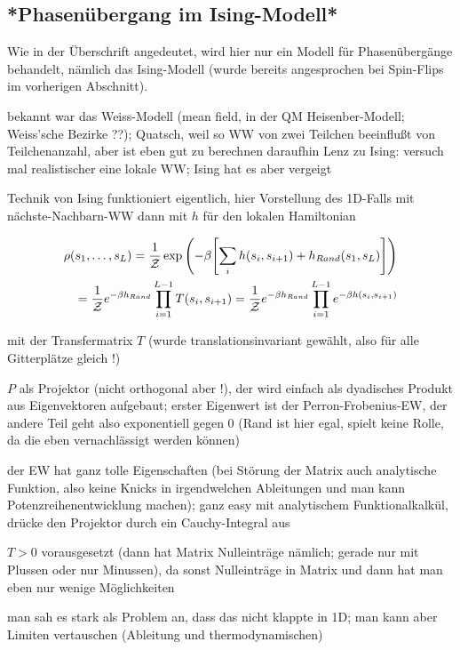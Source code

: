 \documentclass[../KlassMech_main.tex]{subfiles}
\begin{document}
	\subsection{*Phasenübergang im Ising-Modell*}
Wie in der Überschrift angedeutet, wird hier nur ein Modell für Phasenübergänge behandelt, nämlich das Ising-Modell (wurde bereits angesprochen bei Spin-Flips im vorherigen Abschnitt).

bekannt war das Weiss-Modell (mean field, in der QM Heisenber-Modell; Weiss'sche Bezirke ??); Quatsch, weil so WW von zwei Teilchen beeinflußt von Teilchenanzahl, aber ist eben gut zu berechnen
daraufhin Lenz zu Ising: versuch mal realistischer eine lokale WW; Ising hat es aber vergeigt

Technik von Ising funktioniert eigentlich, hier Vorstellung des 1D-Falls mit nächste-Nachbarn-WW
dann mit $h$ für den lokalen Hamiltonian

\begin{align}\label{key}
\rho(s_1, \dots, s_L) = \frac{1}{\mathcal{Z}} \exp\qty(-\beta \qty[\sum\limits_i h(s_i, s_{i+1}) + h_{Rand}(s_1, s_L)])
\\
= \frac{1}{\mathcal{Z}} e^{-\beta h_{Rand}} \prod_{i=1}^{L-1} T(s_i, s_{i+1}) = \frac{1}{\mathcal{Z}} e^{-\beta h_{Rand}} \prod_{i=1}^{L-1} e^{-\beta h(s_i, s_{i+1})}
\end{align}

mit der Transfermatrix $T$ (wurde translationsinvariant gewählt, also für alle Gitterplätze gleich !)

$P$ als Projektor (nicht orthogonal aber !), der wird einfach als dyadisches Produkt aus Eigenvektoren aufgebaut; erster Eigenwert ist der Perron-Frobenius-EW, der andere Teil geht also exponentiell gegen 0 (Rand ist hier egal, spielt keine Rolle, da die eben vernachlässigt werden können)

der EW hat ganz tolle Eigenschaften (bei Störung der Matrix auch analytische Funktion, also keine Knicks in irgendwelchen Ableitungen und man kann Potenzreihenentwicklung machen); ganz easy mit analytischem Funktionalkalkül, drücke den Projektor durch ein Cauchy-Integral aus

$T > 0$ vorausgesetzt (dann hat Matrix Nulleinträge nämlich; gerade nur mit Plussen oder nur Minussen), da sonst Nulleinträge in Matrix und dann hat man eben nur wenige Möglichkeiten


man sah es stark als Problem an, dass das nicht klappte in 1D; man kann aber Limiten vertauschen (Ableitung und thermodynamischen)
\end{document}
